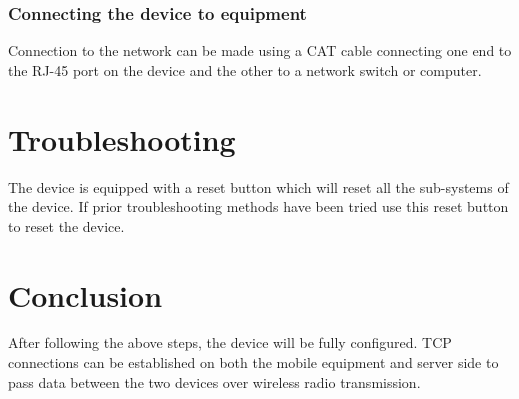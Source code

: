 \subsubsection{Connecting the device to equipment} %
\label{ssub:connecting_the_device_to_equipment}
Connection to the network can be made using a CAT cable connecting one end to the RJ-45 port on the device and the other to a network switch or computer.


\section{Troubleshooting} %
\label{sec:troubleshooting}
The device is equipped with a reset button which will reset all the sub-systems of the device. If prior troubleshooting methods have been tried use this reset button to reset the device.

\section{Conclusion} %
\label{sec:conclusion}
After following the above steps, the device will be fully configured. TCP connections can be established on both the mobile equipment and server side to pass data between the two devices over wireless radio transmission.
